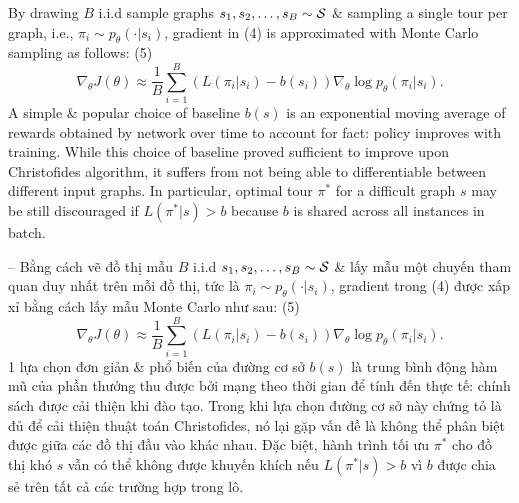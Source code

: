 \documentclass{article}
\begin{document}
\begin{itemize}
    By drawing $B$ i.i.d sample graphs $s_1,s_2,\ldots,s_B\sim{\cal S}$ \& sampling a single tour per graph, i.e., $\pi_i\sim p_\theta(\cdot|s_i)$, gradient in (4) is approximated with Monte Carlo sampling as follows: (5)
    \begin{equation*}
        \nabla_\theta J(\theta)\approx\frac{1}{B}\sum_{i=1}^B (L(\pi_i|s_i) - b(s_i))\nabla_\theta\log p_\theta(\pi_i|s_i).
    \end{equation*}
    A simple \& popular choice of baseline $b(s)$ is an exponential moving average of rewards obtained by network over time to account for fact: policy improves with training. While this choice of baseline proved sufficient to improve upon Christofides algorithm, it suffers from not being able to differentiable between different input graphs. In particular, optimal tour $\pi^*$ for a difficult graph $s$ may be still discouraged if $L(\pi^*|s) > b$ because $b$ is shared across all instances in batch.
    
    -- Bằng cách vẽ đồ thị mẫu $B$ i.i.d $s_1,s_2,\ldots,s_B\sim{\cal S}$ \& lấy mẫu một chuyến tham quan duy nhất trên mỗi đồ thị, tức là $\pi_i\sim p_\theta(\cdot|s_i)$, gradient trong (4) được xấp xỉ bằng cách lấy mẫu Monte Carlo như sau: (5)
    \begin{equation*}
        \nabla_\theta J(\theta)\approx\frac{1}{B}\sum_{i=1}^B (L(\pi_i|s_i) - b(s_i))\nabla_\theta\log p_\theta(\pi_i|s_i).
    \end{equation*}
    1 lựa chọn đơn giản \& phổ biến của đường cơ sở $b(s)$ là trung bình động hàm mũ của phần thưởng thu được bởi mạng theo thời gian để tính đến thực tế: chính sách được cải thiện khi đào tạo. Trong khi lựa chọn đường cơ sở này chứng tỏ là đủ để cải thiện thuật toán Christofides, nó lại gặp vấn đề là không thể phân biệt được giữa các đồ thị đầu vào khác nhau. Đặc biệt, hành trình tối ưu $\pi^*$ cho đồ thị khó $s$ vẫn có thể không được khuyến khích nếu $L(\pi^*|s) > b$ vì $b$ được chia sẻ trên tất cả các trường hợp trong lô.
    

\end{itemize}
\end{document}
